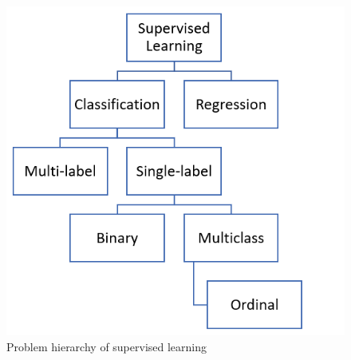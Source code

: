 \documentclass[article,type=msc,colorback,accentcolor=tud7b]{tudthesis}
\begin{document}
    \begin{figure}[H]
      \centering
      \includegraphics{images/problem_hierarchy_supervised_learning}
      \caption{Problem hierarchy of supervised learning}
      \label{fig:problem_hierarchy_supervised_learning}
    \end{figure}
    
\end{document}

